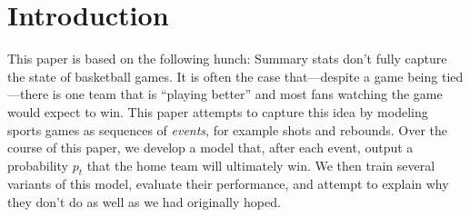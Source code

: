 \section{Introduction}

This paper is based on the following hunch: Summary stats don't fully capture the state of basketball games. It is often the case that---despite a game being tied---there is one team that is ``playing better'' and most fans watching the game would expect to win. This paper attempts to capture this idea by modeling sports games as sequences of \emph{events}, for example shots and rebounds. Over the course of this paper, we develop a model that, after each event, output a probability $p_t$ that the home team will ultimately win. We then train several variants of this model, evaluate their performance, and attempt to explain why they don't do as well as we had originally hoped.

